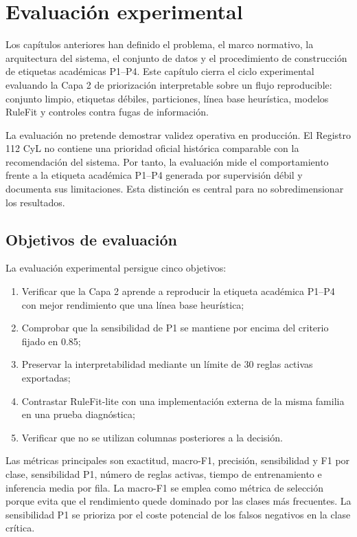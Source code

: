 \chapter{Evaluación experimental}
\label{cap:9}

Los capítulos anteriores han definido el problema, el marco normativo, la arquitectura
del sistema, el conjunto de datos y el procedimiento de construcción de etiquetas académicas
P1--P4. Este capítulo cierra el ciclo experimental evaluando la Capa 2 de priorización
interpretable sobre un flujo reproducible: conjunto limpio, etiquetas débiles,
particiones, línea base heurística, modelos RuleFit y controles contra fugas de
información.

La evaluación no pretende demostrar validez operativa en producción. El Registro 112
CyL no contiene una prioridad oficial histórica comparable con la recomendación del
sistema. Por tanto, la evaluación mide el comportamiento frente a la etiqueta académica
P1--P4 generada por supervisión débil y documenta sus limitaciones. Esta distinción es
central para no sobredimensionar los resultados.

\section{Objetivos de evaluación}

La evaluación experimental persigue cinco objetivos:

\begin{enumerate}
    \item Verificar que la Capa 2 aprende a reproducir la etiqueta académica P1--P4 con
    mejor rendimiento que una línea base heurística;
    \item Comprobar que la sensibilidad de P1 se mantiene por encima del criterio
    fijado en 0.85;
    \item Preservar la interpretabilidad mediante un límite de 30 reglas activas
    exportadas;
    \item Contrastar RuleFit-lite con una implementación externa de la misma familia en una prueba diagnóstica;
    \item Verificar que no se utilizan columnas posteriores a la decisión.
\end{enumerate}

Las métricas principales son exactitud, macro-F1, precisión, sensibilidad y F1 por clase,
sensibilidad P1, número de reglas activas, tiempo de entrenamiento e inferencia media por
fila. La macro-F1 se emplea como métrica de selección porque evita que el rendimiento
quede dominado por las clases más frecuentes. La sensibilidad P1 se prioriza por el
coste potencial de los falsos negativos en la clase crítica.

